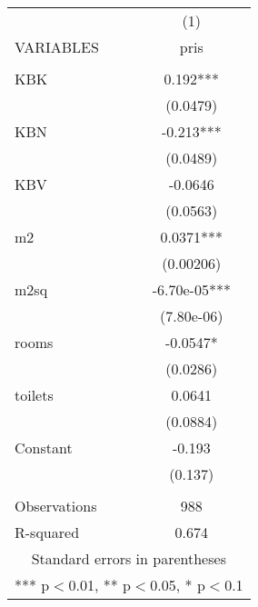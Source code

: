 \documentclass[]{article}
\begin{document}
\begin{tabular}{lc} \hline
 & (1) \\
VARIABLES & pris \\ \hline
 &  \\
KBK & 0.192*** \\
 & (0.0479) \\
KBN & -0.213*** \\
 & (0.0489) \\
KBV & -0.0646 \\
 & (0.0563) \\
m2 & 0.0371*** \\
 & (0.00206) \\
m2sq & -6.70e-05*** \\
 & (7.80e-06) \\
rooms & -0.0547* \\
 & (0.0286) \\
toilets & 0.0641 \\
 & (0.0884) \\
Constant & -0.193 \\
 & (0.137) \\
 &  \\
Observations & 988 \\
 R-squared & 0.674 \\ \hline
\multicolumn{2}{c}{ Standard errors in parentheses} \\
\multicolumn{2}{c}{ *** p$<$0.01, ** p$<$0.05, * p$<$0.1} \\
\end{tabular}
\end{document}
